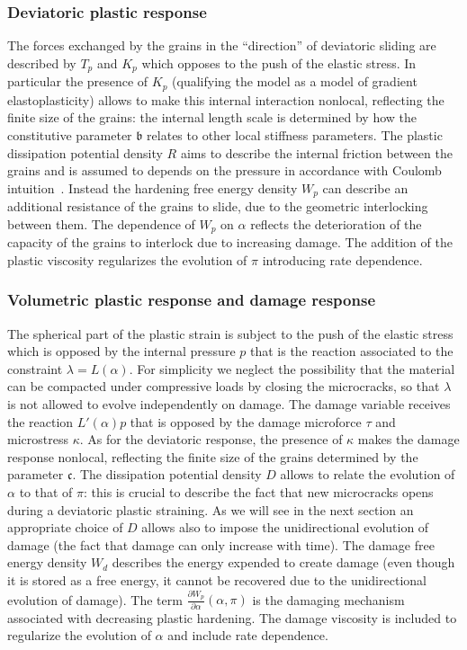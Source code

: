 \documentclass[a4paper,10pt,oneside]{amsbook}
\numberwithin{section}{chapter}
\numberwithin{equation}{chapter}
\theoremstyle{definition}
\newcommand{\dind}[2]{\frac{\partial #1}{\partial #2}}
\begin{document}
\subsubsection*{Deviatoric plastic response} The forces exchanged by the grains in the ``direction'' of deviatoric sliding are described by $T_p$ and $K_p$ which opposes to the push of the elastic stress. In particular the presence of $K_p$ (qualifying the model as a model of gradient elastoplasticity) allows to make this internal interaction nonlocal, reflecting the finite size of the grains: the internal length scale is determined by how the constitutive parameter $\mathfrak{b}$ relates to other local stiffness parameters. The plastic dissipation potential density $R$ aims to describe the internal friction between the grains and is assumed to depends on the pressure in accordance with Coulomb intuition~\cite{Coulomb1776}. Instead the hardening free energy density $W_p$ can describe an additional resistance of the grains to slide, due to the geometric interlocking between them. The dependence of $W_p$ on $\alpha$ reflects the deterioration of the capacity of the grains to interlock due to increasing damage. The addition of the plastic viscosity regularizes the evolution of $\pi$ introducing rate dependence.

\subsubsection*{Volumetric plastic response and damage response}

The spherical part of the plastic strain is subject to the push of the elastic stress which is opposed by the internal pressure $p$ that is the reaction associated to the constraint $\lambda=L(\alpha)$. For simplicity we neglect the possibility that the material can be compacted under compressive loads by closing the microcracks, so that $\lambda$ is not allowed to evolve independently on damage. The damage variable receives the reaction $L'(\alpha)p$ that is opposed by the damage microforce $\tau$ and microstress $\kappa$. As for the deviatoric response, the presence of $\kappa$ makes the damage response nonlocal, reflecting the finite size of the grains determined by the parameter $\mathfrak{c}$. The dissipation potential density $D$ allows to relate the evolution of $\alpha$ to that of $\pi$: this is crucial to describe the fact that new microcracks opens during a deviatoric plastic straining. As we will see in the next section an appropriate choice of $D$ allows also to impose the unidirectional evolution of damage (the fact that damage can only increase with time). The damage free energy density $W_d$ describes the energy expended to create damage (even though it is stored as a free energy, it cannot be recovered due to the unidirectional evolution of damage). The term $\dind{W_p}{\alpha}(\alpha,\pi)$ is the damaging mechanism associated with decreasing plastic hardening. The damage viscosity is included to regularize the evolution of $\alpha$ and include rate dependence.
\end{document}
